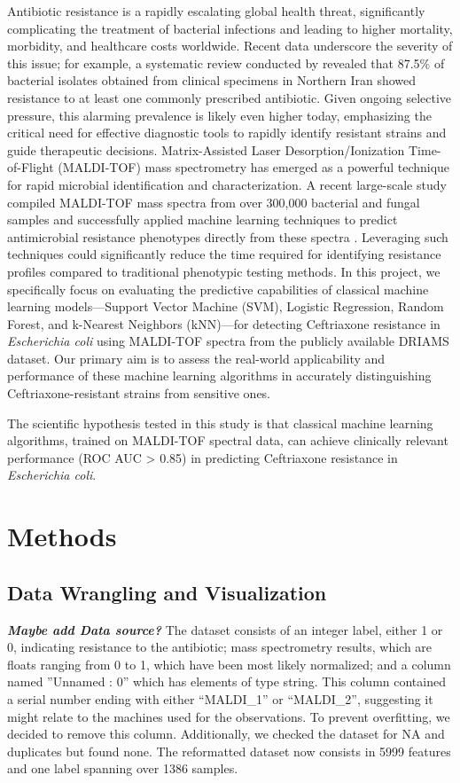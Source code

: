 \documentclass{article}
\begin{document}
Antibiotic resistance is a rapidly escalating global health threat, significantly complicating the treatment of bacterial infections and leading to higher mortality, morbidity, and healthcare costs worldwide. Recent data underscore the severity of this issue; for example, a systematic review conducted by \citet{IranBacteria} revealed that 87.5\% of bacterial isolates obtained from clinical specimens in Northern Iran showed resistance to at least one commonly prescribed antibiotic. Given ongoing selective pressure, this alarming prevalence is likely even higher today, emphasizing the critical need for effective diagnostic tools to rapidly identify resistant strains and guide therapeutic decisions.
Matrix-Assisted Laser Desorption/Ionization Time-of-Flight (MALDI-TOF) mass spectrometry has emerged as a powerful technique for rapid microbial identification and characterization. A recent large-scale study compiled MALDI-TOF mass spectra from over 300,000 bacterial and fungal samples and successfully applied machine learning techniques to predict antimicrobial resistance phenotypes directly from these spectra \citep{datasetExplaination, Astudillo2024}. Leveraging such techniques could significantly reduce the time required for identifying resistance profiles compared to traditional phenotypic testing methods.
In this project, we specifically focus on evaluating the predictive capabilities of classical machine learning models—Support Vector Machine (SVM), Logistic Regression, Random Forest, and k-Nearest Neighbors (kNN)—for detecting Ceftriaxone resistance in \textit{Escherichia coli} using MALDI-TOF spectra from the publicly available DRIAMS dataset. Our primary aim is to assess the real-world applicability and performance of these machine learning algorithms in accurately distinguishing Ceftriaxone-resistant strains from sensitive ones.

The scientific hypothesis tested in this study is that classical machine learning algorithms, trained on MALDI-TOF spectral data, can achieve clinically relevant performance (ROC AUC > 0.85) in predicting Ceftriaxone resistance in \textit{Escherichia coli}.

\section{Methods}

\subsection{Data Wrangling and Visualization}
\textbf{\textit{Maybe add Data source? 
}}The dataset consists of an integer label, either 1 or 0, indicating resistance to the antibiotic; mass
spectrometry results, which are floats ranging from 0 to 1, which have been most likely normalized; and a
column named ”Unnamed : 0” which has elements of type string. This column contained a serial number
ending with either “MALDI\_1” or “MALDI\_2”, suggesting it might relate to the machines used for the
observations. To prevent overfitting, we decided to remove this column. Additionally, we checked the
dataset for NA and duplicates but found none. The reformatted dataset now consists in 5999 features
and one label spanning over 1386 samples. 
\end{document}
